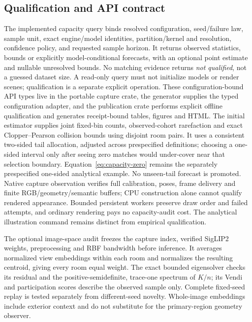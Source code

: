 \documentclass{article}
\begin{document}
\subsection{Qualification and API contract}
The implemented capacity query binds resolved configuration, seed/failure law, sample
unit, exact engine/model identities, partition/kernel and resolution, confidence
policy, and requested sample horizon. It returns observed statistics, bounds or
explicitly model-conditional forecasts, with an optional point estimate and
nullable unresolved bounds. No matching evidence returns \emph{not qualified},
not a guessed dataset size. A read-only query must not initialize models or render
scenes; qualification is a separate explicit operation. These configuration-bound
API types live in the portable capture crate, the generator supplies the typed
configuration adapter, and the publication crate performs explicit offline
qualification and generates receipt-bound tables, figures and HTML. The initial
estimator supplies joint fixed-bin counts, observed-cohort rarefaction and exact
Clopper--Pearson collision bounds using disjoint room pairs. It uses a consistent
two-sided tail allocation, adjusted across prespecified definitions; choosing a
one-sided interval only after seeing zero matches would under-cover near that
selection boundary. Equation~\ref{eq:capacity-zero} remains the separately
prespecified one-sided analytical example. No unseen-tail forecast is promoted.
Native capture observation verifies full calibration, poses, frame delivery and
finite RGB/geometry/semantic buffers; CPU construction alone cannot qualify
rendered appearance. Bounded persistent workers preserve draw order and failed
attempts, and ordinary rendering pays no capacity-audit cost. The analytical
illustration command remains distinct from empirical qualification.

The optional image-space audit freezes the capture index, verified SigLIP2 weights,
preprocessing and RBF bandwidth before inference. It averages normalized view
embeddings within each room and normalizes the resulting centroid, giving every
room equal weight. The exact bounded eigensolver checks its residual and the
positive-semidefinite, trace-one spectrum of $K/n$; its Vendi and participation
scores describe the observed sample only. Complete fixed-seed replay is tested
separately from different-seed novelty. Whole-image embeddings include exterior
context and do not substitute for the primary-region geometry observer.
\end{document}
